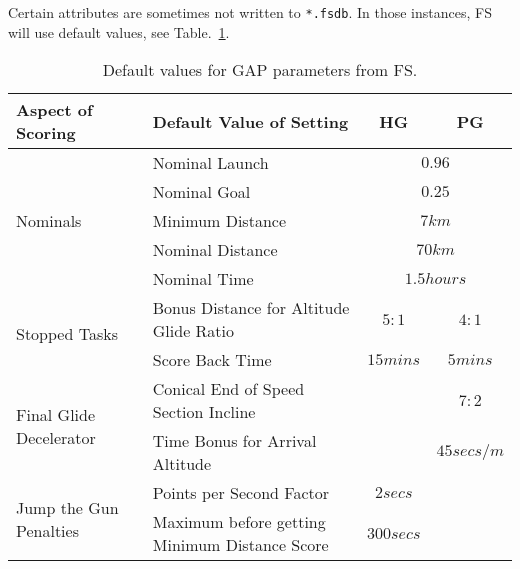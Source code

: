\documentclass[gap.tex]{subfiles}
\begin{document}
Certain attributes are sometimes not written to \texttt{*.fsdb}. In those
instances, FS will use default values, see Table.~\ref{tab:gap-defaults}.

\begin{table}[!ht]
    \begin{tabularx}{\textwidth}{|l|X|c|c|}
    \hline
        Aspect of Scoring
        & Default Value of Setting
        & HG
        & PG
        \\
    \hline
        \multirow{5}{*}{Nominals}
        & Nominal Launch
        & \multicolumn{2}{c|}{$0.96$}
        \\
    \cline{2-4}
        & Nominal Goal
        & \multicolumn{2}{c|}{$0.25$}
        \\
    \cline{2-4}
        & Minimum Distance
        & \multicolumn{2}{c|}{$7 km$}
        \\
    \cline{2-4}
        & Nominal Distance
        & \multicolumn{2}{c|}{$70 km$}
        \\
    \cline{2-4}
        & Nominal Time
        & \multicolumn{2}{c|}{$1.5 hours$}
        \\
    \hline
        \multirow{2}{*}{Stopped Tasks}
        & Bonus Distance for Altitude Glide Ratio
        & $5:1$
        & $4:1$
        \\
    \cline{2-4}
        & Score Back Time
        & $15 mins$
        & $5 mins$
        \\
    \hline
        \multirow{2}{*}{Final Glide Decelerator}
        & Conical End of Speed Section Incline
        &
        & $7:2$
        \\
    \cline{2-4}
        & Time Bonus for Arrival Altitude
        &
        & $45 secs / m$
        \\
    \hline
        \multirow{2}{*}{Jump the Gun Penalties}
        & Points per Second Factor
        & $2 secs$
        &
        \\
    \cline{2-4}
        & Maximum before getting Minimum Distance Score
        & $300 secs$
        &
        \\
    \hline
    \end{tabularx}
    \caption{Default values for GAP parameters from FS.}
    \label{tab:gap-defaults}
\end{table}
\end{document}
